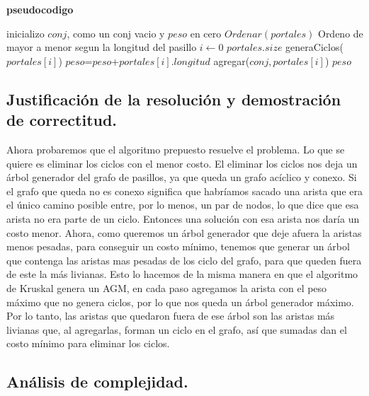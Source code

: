 \textbf{pseudocodigo} %

\begin{codebox}
	\li \Comment inicializo $conj$, como un conj vacio y $peso$ en cero
	\li $Ordenar(portales)$	
	\li \Comment Ordeno de mayor a menor segun la longitud del pasillo
	\li \For $i \gets 0$ \To $portales.size$ \Do
	\li		\If generaCiclos($portales[i]$)
	\li			\Then $peso $=$ peso $+$ portales[i].longitud$
	\li 				\Else agregar($conj, portales[i]$) 
			\End
		\End
	\li \Return $peso$
\end{codebox}


\subsection{Justificación de la resolución y demostración de correctitud.}

\vspace*{0.3cm}

Ahora probaremos que el algoritmo prepuesto resuelve el problema. Lo que se quiere es eliminar los ciclos con el menor costo. El eliminar los ciclos nos deja un árbol generador del grafo de pasillos, ya que queda un grafo acíclico y conexo. Si el grafo que queda no es conexo significa que habríamos sacado una arista que era el único camino posible entre, por lo menos, un par de nodos, lo que dice que esa arista no era parte de un ciclo. Entonces una solución con esa arista nos daría un costo menor. \newline 
Ahora, como queremos un árbol generador que deje afuera la aristas menos pesadas, para conseguir un costo mínimo, tenemos que generar un árbol que contenga las aristas mas pesadas de los ciclo del grafo, para que queden fuera de este la más livianas. Esto lo hacemos de la misma manera en que el algoritmo de Kruskal genera un AGM, en cada paso agregamos la arista con el peso máximo que no genera ciclos, por lo que nos queda un árbol generador máximo. Por lo tanto, las aristas que quedaron fuera de ese árbol son las aristas más livianas que, al agregarlas, forman un ciclo en el grafo, así que sumadas dan el costo mínimo para eliminar los ciclos.

\subsection{Análisis de complejidad.}

\vspace*{0.3cm}

